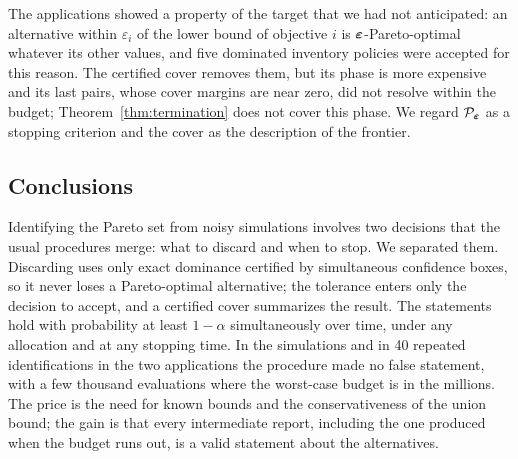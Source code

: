 The applications showed a property of the target that we had not anticipated: an alternative within $\varepsilon_i$ of the lower bound of objective $i$ is $\bm{\varepsilon}$-Pareto-optimal whatever its other values, and five dominated inventory policies were accepted for this reason. The certified cover removes them, but its phase is more expensive and its last pairs, whose cover margins are near zero, did not resolve within the budget; Theorem~\ref{thm:termination} does not cover this phase. We regard $\mathcal{P}_{\bm{\varepsilon}}$ as a stopping criterion and the cover as the description of the frontier.

\subsection{Conclusions}\label{sec:conclusion}

Identifying the Pareto set from noisy simulations involves two decisions that the usual procedures merge: what to discard and when to stop. We separated them. Discarding uses only exact dominance certified by simultaneous confidence boxes, so it never loses a Pareto-optimal alternative; the tolerance enters only the decision to accept, and a certified cover summarizes the result. The statements hold with probability at least $1-\alpha$ simultaneously over time, under any allocation and at any stopping time. In the simulations and in 40 repeated identifications in the two applications the procedure made no false statement, with a few thousand evaluations where the worst-case budget is in the millions. The price is the need for known bounds and the conservativeness of the union bound; the gain is that every intermediate report, including the one produced when the budget runs out, is a valid statement about the alternatives.
